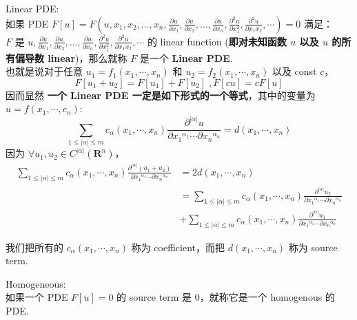 \begin{defn}
    Linear PDE:
    \\
    如果 PDE $F[u] = F(u, x_1, x_2, \ldots, x_n, \frac{\partial u}{\partial x_1}, \frac{\partial u}{\partial x_2}, \ldots, \frac{\partial u}{\partial x_n}, \frac{\partial^2 u}{\partial x_1 ^ 2}, \frac{\partial^2 u}{\partial x_1 x_2 }, \cdots) = 0$ 
    满足：
    \\$F$ 是 $u, \frac{\partial u}{\partial x_1}, \frac{\partial u}{\partial x_2}, \ldots, \frac{\partial u}{\partial x_n}, \frac{\partial^2 u}{\partial x_1 ^ 2}, \frac{\partial^2 u}{\partial x_1 x_2 }, \cdots$ 的 linear function (\textbf{即对未知函数 $u$ 以及 $u$ 的所有偏导数 linear})，那么就称 $F$ 是一个 \textbf{Linear PDE}.
    \\ 也就是说对于任意 $u_1 = f_1(x_1, \cdots, x_n)$ 和 $u_2 = f_2(x_1, \cdots, x_n)$ 以及 const $c$，$$F[u_1 + u_2] = F[u_1] + F[u_2] \; , F[cu] = cF[u]$$
    因而显然 \textbf{一个 Linear PDE 一定是如下形式的一个等式}，其中的变量为 $u = f(x_1,  \cdots, c_n)$:
    $$
        \sum_{1 \leq |\alpha| \leq m} c_{\alpha}(x_1, \cdots, x_n) \frac{\partial ^ {|\alpha|} {u}}{\partial{x_1}^{\alpha_1} \cdots \partial{x_n}^{\alpha_n}} = d(x_1, \cdots, x_n)
    $$
    因为 $\forall u_1, u_2 \in C^{|\alpha|}(\mathbf{R}^n)$，
    \begin{align}
         \sum_{1 \leq |\alpha| \leq m} c_{\alpha}(x_1, \cdots, x_n) \frac{\partial ^ {|\alpha|} {(u_1 + u_2)}}{\partial{x_1}^{\alpha_1} \cdots \partial{x_n}^{\alpha_n}}
         &= 2d(x_1, \cdots, x_n) \\
         &= \sum_{1 \leq |\alpha| \leq m} c_{\alpha}(x_1, \cdots, x_n) \frac{\partial ^ {|\alpha|} {u_2}}{\partial{x_1}^{\alpha_1} \cdots \partial{x_n}^{\alpha_n}}\\
   & + \sum_{1 \leq |\alpha| \leq m} c_{\alpha}(x_1, \cdots, x_n) \frac{\partial ^ {|\alpha|} {u_1}}{\partial{x_1}^{\alpha_1} \cdots \partial{x_n}^{\alpha_n}}
    \end{align}
    
我们把所有的 $c_\alpha(x_1, \cdots, x_n)$ 称为 coefficient，而把 $d(x_1, \cdots, x_n)$ 称为 source term.
\end{defn}

\begin{defn}
    Homogeneous:
    \\如果一个 PDE $F[u] = 0 $ 的 source term 是 0，就称它是一个 homogenous 的 PDE.
\end{defn}

